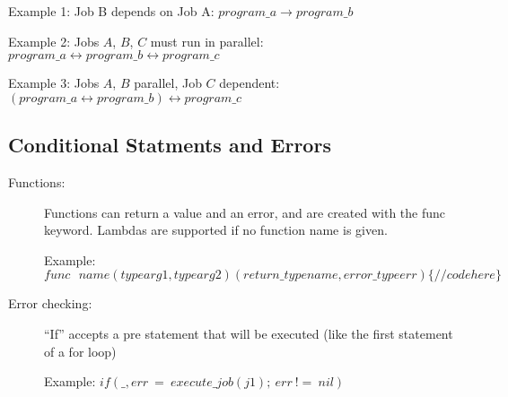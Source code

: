Example 1: Job B depends on Job A: $program\_a \rightarrow program\_b$

Example 2: Jobs $A$, $B$, $C$ must run in parallel: $program\_a 
\leftrightarrow program\_b \leftrightarrow program\_c$

Example 3:
Jobs $A$, $B$ parallel, Job $C$ dependent:
$(program\_a \leftrightarrow program\_b ) \leftrightarrow program\_c$

\subsection{Conditional Statments and Errors}
\begin{description}
\item [Functions:] Functions can return a value and an error, 
and are created with the func keyword. Lambdas are supported if no function name is given.

Example:
$func~~~name(type arg1, type arg2)(return\_type name, error\_type err)\{ //code here\}$ 
%

\item [Error checking:] ``If'' accepts a pre statement that will be executed (like the first 
statement of a for loop)

Example:
$if (\_, err~=~execute\_job(j1);~ err~ !=~ nil) {}$
\end{description}


%
%
%
%
